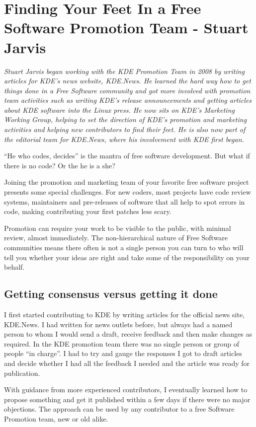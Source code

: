 \chapter{Finding Your Feet In a Free Software Promotion Team - Stuart Jarvis}

\textit{Stuart Jarvis began working with the KDE Promotion Team in 2008 by writing articles for KDE's news website, KDE.News. He learned the hard way how to get things done in a Free Software community and got more involved with promotion team activities such as writing KDE's release announcements and getting articles about KDE software into the Linux press. He now sits on KDE's Marketing Working Group, helping to set the direction of KDE's promotion and marketing activities and helping new contributors to find their feet. He is also now part of the editorial team for KDE.News, where his involvement with KDE first began.}

``He who codes, decides'' is the mantra of free software development. But what if there is no code? Or the he is a she?

Joining the promotion and marketing team of your favorite free software project presents some special challenges. For new coders, most projects have code review systems, maintainers and pre-releases of software that all help to spot errors in code, making contributing your first patches less scary. 

Promotion can require your work to be visible to the public, with minimal review, almost immediately. The non-hierarchical nature of Free Software communities means there often is not a single person you can turn to who will tell you whether your ideas are right and take some of the responsibility on your behalf.

\section*{Getting consensus versus getting it done}

I first started contributing to KDE by writing articles for the official news site, KDE.News. I had written for news outlets before, but always had a named person to whom I would send a draft, receive feedback and then make changes as required. In the KDE promotion team there was no single person or group of people ``in charge''. I had to try and gauge the responses I got to draft articles and decide whether I had all the feedback I needed and the article was ready for publication.

With guidance from more experienced contributors, I eventually learned how to propose something and get it published within a few days if there were no major objections. The approach can be used by any contributor to a free Software Promotion team, new or old alike.

